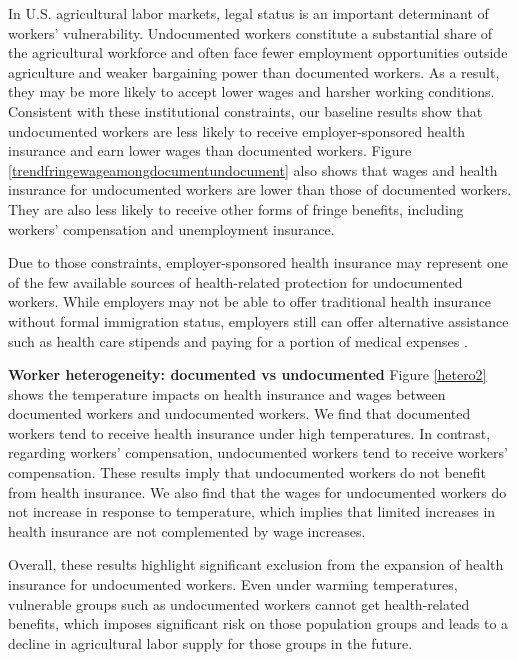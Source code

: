 \documentclass[12pt]{article}
\begin{document}
In U.S. agricultural labor markets, legal status is an important determinant of workers' vulnerability. Undocumented workers constitute a substantial share of the agricultural workforce and often face fewer employment opportunities outside agriculture and weaker bargaining power than documented workers. As a result, they may be more likely to accept lower wages and harsher working conditions. Consistent with these institutional constraints, our baseline results show that undocumented workers are less likely to receive employer-sponsored health insurance and earn lower wages than documented workers. Figure \ref{trendfringewageamongdocumentundocument} also shows that wages and health insurance for undocumented workers are lower than those of documented workers. They are also less likely to receive other forms of fringe benefits, including workers' compensation and unemployment insurance. 


Due to those constraints, employer-sponsored health insurance may represent one of the few available sources of health-related protection for undocumented workers. While employers may not be able to offer traditional health insurance without formal immigration status, employers still can offer alternative assistance such as health care stipends and paying for a portion of medical expenses \citep{college_of_agricultural_sciences_the_pennsylvania_state_university_navigating_2025}.


\vspace{0.5cm}
\noindent \textbf{Worker heterogeneity: documented vs undocumented}
Figure \ref{hetero2} shows the temperature impacts on health insurance and wages between documented workers and undocumented workers. 
We find that documented workers tend to receive health insurance under high temperatures. In contrast, regarding workers' compensation, undocumented workers tend to receive workers' compensation. These results imply that undocumented workers do not benefit from health insurance. We also find that the wages for undocumented workers do not increase in response to temperature, which implies that limited increases in health insurance are not complemented by wage increases. 


Overall, these results highlight significant exclusion from the expansion of health insurance for undocumented workers. Even under warming temperatures, vulnerable groups such as undocumented workers cannot get health-related benefits, which imposes significant risk on those population groups and leads to a decline in agricultural labor supply for those groups in the future. 
\end{document}
